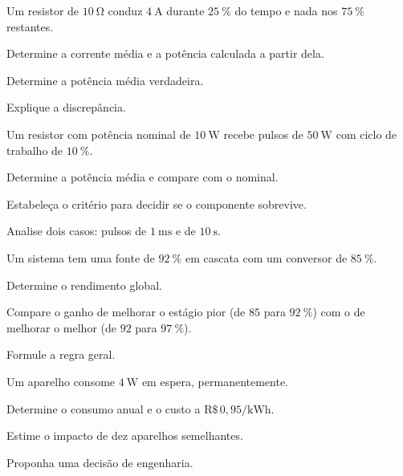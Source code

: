 \blocoaprofundamento
\begin{questao}[3]{}

Um resistor de $\SI{10}{\ohm}$ conduz $\SI{4}{\ampere}$ durante
$\SI{25}{\percent}$ do tempo e nada nos $\SI{75}{\percent}$ restantes.
\begin{itensq}
\item Determine a corrente média e a potência calculada a partir dela.
\item Determine a potência média verdadeira.
\item Explique a discrepância.
\end{itensq}


\end{questao}
\begin{questao}[3]{}

Um resistor com potência nominal de $\SI{10}{\watt}$ recebe pulsos de
$\SI{50}{\watt}$ com ciclo de trabalho de $\SI{10}{\percent}$.
\begin{itensq}
\item Determine a potência média e compare com o nominal.
\item Estabeleça o critério para decidir se o componente sobrevive.
\item Analise dois casos: pulsos de $\SI{1}{\milli\second}$ e de
      $\SI{10}{\second}$.
\end{itensq}


\end{questao}
\begin{questao}[3]{}

Um sistema tem uma fonte de $\SI{92}{\percent}$ em cascata com um conversor de
$\SI{85}{\percent}$.
\begin{itensq}
\item Determine o rendimento global.
\item Compare o ganho de melhorar o estágio pior (de $85$ para
      $\SI{92}{\percent}$) com o de melhorar o melhor (de $92$ para
      $\SI{97}{\percent}$).
\item Formule a regra geral.
\end{itensq}


\end{questao}
\begin{questao}[3]{}

Um aparelho consome $\SI{4}{\watt}$ em espera, permanentemente.
\begin{itensq}
\item Determine o consumo anual e o custo a
      $\mathrm{R\$}\,0{,}95/\si{\kilo\watt\hour}$.
\item Estime o impacto de dez aparelhos semelhantes.
\item Proponha uma decisão de engenharia.
\end{itensq}


\end{questao}
